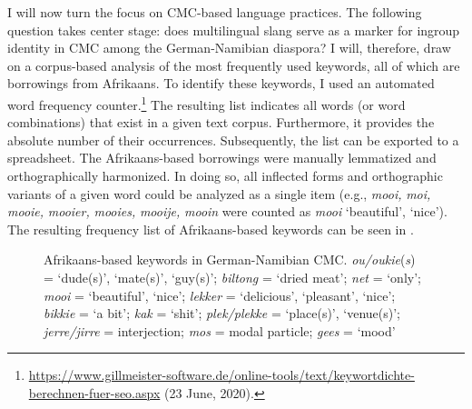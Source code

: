 \documentclass[output=paper]{langsci/langscibook}
\begin{document}
I will now turn the focus on CMC-based language practices. The following question takes center stage: does multilingual slang serve as a marker for ingroup identity in CMC among the German-Namibian diaspora? I will, therefore, draw on a corpus-based analysis of the most frequently used keywords, all of which are borrowings from Afrikaans. To identify these keywords, I used an automated word frequency counter.\footnote{\url{https://www.gillmeister-software.de/online-tools/text/keywortdichte-berechnen-fuer-seo.aspx} (23 June, 2020).} The resulting list indicates all words (or word combinations) that exist in a given text corpus. Furthermore, it provides the absolute number of their occurrences. Subsequently, the list can be exported to a spreadsheet. The Afrikaans-based borrowings were manually lemmatized and orthographically harmonized. In doing so, all inflected forms and orthographic variants of a given word could be analyzed as a single item (e.g., \textit{mooi,} \textit{moi,} \textit{mooie,} \textit{mooier,} \textit{mooies,} \textit{mooije,} \textit{mooin} were counted as \textit{mooi} ‘beautiful’, ‘nice’). The resulting frequency list of Afrikaans-based keywords can be seen in .

 

  \begin{figure}
\caption{Afrikaans-based keywords in German-Namibian CMC. \textit{ou/oukie}(\textit{s}) = ‘dude(s)’, ‘mate(s)’, ‘guy(s)’; \textit{biltong} = ‘dried meat’; \textit{net} = ‘only’; \textit{mooi} = ‘beautiful’, ‘nice’; \textit{lekker} = ‘delicious’, ‘pleasant’, ‘nice’; \textit{bikkie} = ‘a bit’; \textit{kak} = ‘shit’; \textit{plek/plekke} = ‘place(s)’, ‘venue(s)’; \textit{jerre/jirre} = interjection; \textit{mos} = modal particle; \textit{gees} = ‘mood’}
\label{fig:radke:3}
\end{figure}  
\end{document}
